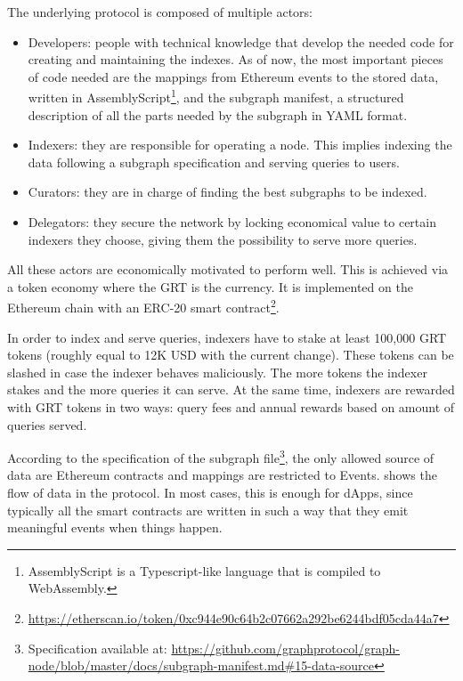 The underlying protocol is composed of multiple actors:

\begin{itemize}
  \item Developers: people with technical knowledge that develop the needed code for creating and maintaining the indexes. As of now, the most important pieces of code needed are the mappings from Ethereum events to the stored data, written in AssemblyScript\footnote{AssemblyScript is a Typescript-like language that is compiled to WebAssembly.}, and the subgraph manifest, a structured description of all the parts needed by the subgraph in YAML format.  
  \item Indexers: they are responsible for operating a node. This implies indexing the data following a subgraph specification and serving queries to users.
  \item Curators: they are in charge of finding the best subgraphs to be indexed.
  \item Delegators: they secure the network by locking economical value to certain indexers they choose, giving them the possibility to serve more queries.
\end{itemize}

All these actors are economically motivated to perform well. This is achieved via a token economy where the GRT is the currency. It is implemented on the Ethereum chain with an ERC-20 smart contract\footnote{\url{https://etherscan.io/token/0xc944e90c64b2c07662a292be6244bdf05cda44a7}}.

In order to index and serve queries, indexers have to stake at least 100,000 GRT tokens (roughly equal to 12K USD with the current change). These tokens can be slashed in case the indexer behaves maliciously. The more tokens the indexer stakes and the more queries it can serve. At the same time, indexers are rewarded with GRT tokens in two ways: query fees and annual rewards based on amount of queries served.

According to the specification of the subgraph file\footnote{Specification available at: \url{https://github.com/graphprotocol/graph-node/blob/master/docs/subgraph-manifest.md\#15-data-source}}, the only allowed source of data are Ethereum contracts and mappings are restricted to Events.  shows the flow of data in the protocol. In most cases, this is enough for dApps, since typically all the smart contracts are written in such a way that they emit meaningful events when things happen. 

